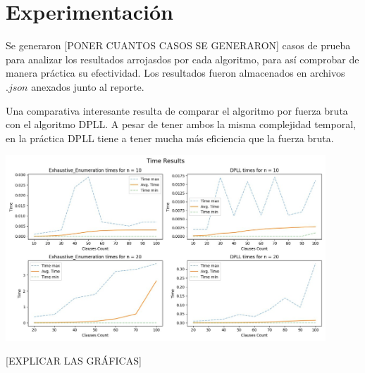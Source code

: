 \documentclass{article}
\begin{document}
\section*{Experimentación}
    Se generaron [PONER CUANTOS CASOS SE GENERARON] casos de prueba para analizar los resultados arrojasdos por cada 
    algoritmo, para así comprobar de manera práctica su efectividad. Los resultados fueron almacenados en archivos 
    $.json$ anexados junto al reporte.
    
    Una comparativa interesante resulta de comparar el algoritmo por fuerza bruta con el algoritmo DPLL. A 
    pesar de tener ambos la misma complejidad temporal, en la práctica DPLL tiene a tener mucha más eficiencia 
    que la fuerza bruta. 

    \includegraphics*[width = 0.9\textwidth]{resources/comp_algs.png}
    
    [EXPLICAR LAS GRÁFICAS]




\end{document}
